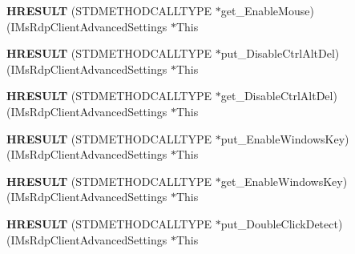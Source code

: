 \begin{DoxyCompactItemize}
\item 
\mbox{\label{struct_i_ms_rdp_client_advanced_settings_vtbl_accb8482493b7f573e5009d61634d6cdd}} 
{\bfseries H\+R\+E\+S\+U\+LT} (S\+T\+D\+M\+E\+T\+H\+O\+D\+C\+A\+L\+L\+T\+Y\+PE $\ast$get\+\_\+\+Enable\+Mouse)(I\+Ms\+Rdp\+Client\+Advanced\+Settings $\ast$This
\item 
\mbox{\label{struct_i_ms_rdp_client_advanced_settings_vtbl_a5d26d1b3454a6184a7de977632362e30}} 
{\bfseries H\+R\+E\+S\+U\+LT} (S\+T\+D\+M\+E\+T\+H\+O\+D\+C\+A\+L\+L\+T\+Y\+PE $\ast$put\+\_\+\+Disable\+Ctrl\+Alt\+Del)(I\+Ms\+Rdp\+Client\+Advanced\+Settings $\ast$This
\item 
\mbox{\label{struct_i_ms_rdp_client_advanced_settings_vtbl_a64354dc4e0d521065bbd520212e9a1f5}} 
{\bfseries H\+R\+E\+S\+U\+LT} (S\+T\+D\+M\+E\+T\+H\+O\+D\+C\+A\+L\+L\+T\+Y\+PE $\ast$get\+\_\+\+Disable\+Ctrl\+Alt\+Del)(I\+Ms\+Rdp\+Client\+Advanced\+Settings $\ast$This
\item 
\mbox{\label{struct_i_ms_rdp_client_advanced_settings_vtbl_a9c48f859f28419cdeb8ad22291a2bdf0}} 
{\bfseries H\+R\+E\+S\+U\+LT} (S\+T\+D\+M\+E\+T\+H\+O\+D\+C\+A\+L\+L\+T\+Y\+PE $\ast$put\+\_\+\+Enable\+Windows\+Key)(I\+Ms\+Rdp\+Client\+Advanced\+Settings $\ast$This
\item 
\mbox{\label{struct_i_ms_rdp_client_advanced_settings_vtbl_a3e0818a29157538d6c681d3c34da84f5}} 
{\bfseries H\+R\+E\+S\+U\+LT} (S\+T\+D\+M\+E\+T\+H\+O\+D\+C\+A\+L\+L\+T\+Y\+PE $\ast$get\+\_\+\+Enable\+Windows\+Key)(I\+Ms\+Rdp\+Client\+Advanced\+Settings $\ast$This
\item 
\mbox{\label{struct_i_ms_rdp_client_advanced_settings_vtbl_a2de24ec4273f6aa128296f1842602032}} 
{\bfseries H\+R\+E\+S\+U\+LT} (S\+T\+D\+M\+E\+T\+H\+O\+D\+C\+A\+L\+L\+T\+Y\+PE $\ast$put\+\_\+\+Double\+Click\+Detect)(I\+Ms\+Rdp\+Client\+Advanced\+Settings $\ast$This
\item 
\mbox{\label{struct_i_ms_rdp_client_advanced_settings_vtbl_a35edceeb504c2b862352176742557094}} 

\end{DoxyCompactItemize}

